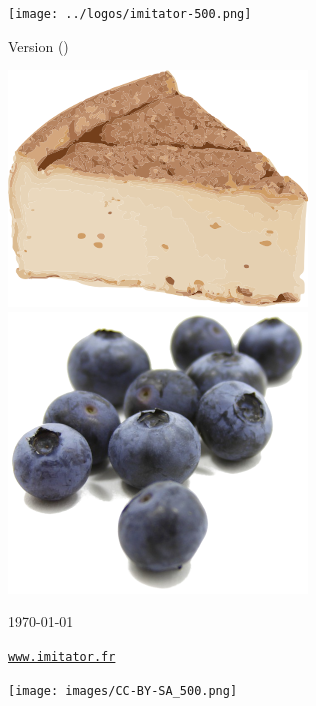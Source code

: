 
\thispagestyle{empty}

\mbox{}

\vspace{1cm}

\begin{center}
	{\Huge \bfseries \titleOnFirstPage{}}

	\vspace{2cm}

	\texttt{[image: ../logos/imitator-500.png]}

	\vspace{2.5cm}
	
	{\Large Version \imitatorversion{} (\imitatorversionname{})}
	
	\medskip
	
	\includegraphics[height=0.15\textwidth]{../logos/logo-3-300.png}
	\hspace{2em}
	\includegraphics[height=0.15\textwidth]{../logos/logo-3-2-300.png}

\end{center}

\vspace{1.5cm}

{\small \hfill{}\today{}}

\vspace{2cm}

\begin{center}
 	{\Large \href{https://www.imitator.fr/}{\nolinkurl{www.imitator.fr}}}
 	
\end{center}
\hfill\texttt{[image: images/CC-BY-SA\_500.png]}




\newpage

\tableofcontents
{}

\newpage
